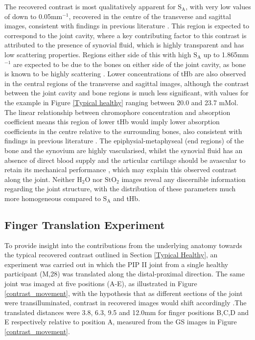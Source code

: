 \documentclass[twoside]{bhamthesis}
\theoremstyle{definition}
\begin{document}
The recovered contrast is most qualitatively apparent for $\mathrm{S_A}$, with very low values of down to 0.05mm$^{-1}$, recovered in the centre of the transverse and sagittal images, consistent with findings in previous literature \cite{montejo2013computer,yuan2010image}. This region is expected to correspond to the joint cavity, where a key contributing factor to this contrast is attributed to the presence of synovial fluid, which is highly transparent and has low scattering properties. Regions either side of this with high $\mathrm{S_A}$ up to 1.865mm$^{-1}$ are expected to be due to the bones on either side of the joint cavity, as bone is known to be highly scattering \cite{alexandrakis2005tomographic}. Lower concentrations of tHb are also observed in the central regions of the transverse and sagittal images, although the contrast between the joint cavity and bone regions is much less significant, with values for the example in Figure \ref{Typical healthy} ranging between 20.0 and 23.7 mMol. The linear relationship between chromophore concentration and absorption coefficient means this region of lower tHb would imply lower absorption coefficients in the centre relative to the surrounding bones, also consistent with findings in previous literature \cite{montejo2013computer,yuan2010image}. The epiphysial-metaphyseal (end regions) of the bone and the synovium are highly vascularised, whilst the synovial fluid has an absence of direct blood supply and the articular cartilage should be avascular to retain its mechanical performance \cite{haywood2001vasculature}, which may explain this observed contrast along the joint. Neither $\mathrm{H_2O}$ nor $\mathrm{StO_2}$ images reveal any discernible information regarding the joint structure, with the distribution of these parameters much more homogeneous compared to $\mathrm{S_A}$ and tHb. 

\subsection{Finger Translation Experiment}

To provide insight into the contributions from the underlying anatomy towards the typical recovered contrast outlined in Section \ref{Typical Healthy}, an experiment was carried out in which the PIP II joint from a single healthy participant (M,28) was translated along the distal-proximal direction. The same joint was imaged at five positions (A-E), as illustrated in Figure \ref{contrast_movement}, with the hypothesis that as different sections of the joint were transilluminated, contrast in recovered images would shift accordingly .The translated distances were 3.8, 6.3, 9.5 and 12.0mm for finger positions B,C,D and E respectively relative to position A, measured from the GS images in Figure \ref{contrast_movement}.
\end{document}
